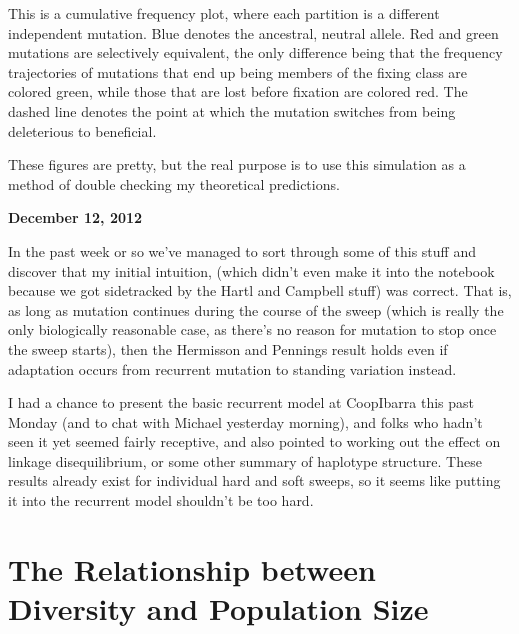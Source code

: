 \documentclass[reqno]{amsart}
\begin{document}
This is a cumulative frequency plot, where each partition is a different independent mutation. Blue denotes the ancestral, neutral allele. Red and green mutations are selectively equivalent, the only difference being that the frequency trajectories of mutations that end up being members of the fixing class are colored green, while those that are lost before fixation are colored red. The dashed line denotes the point at which the mutation switches from being deleterious to beneficial.

These figures are pretty, but the real purpose is to use this simulation as a method of double checking my theoretical predictions.
\begin{flushright}
	\textbf{December 12, 2012}
\end{flushright}
In the past week or so we've managed to sort through some of this stuff and discover that my initial intuition, (which didn't even make it into the notebook because we got sidetracked by the Hartl and Campbell stuff) was correct. That is, as long as mutation continues during the course of the sweep (which is really the only biologically reasonable case, as there's no reason for mutation to stop once the sweep starts), then the Hermisson and Pennings result holds even if adaptation occurs from recurrent mutation to standing variation instead.

I had a chance to present the basic recurrent model at CoopIbarra this past Monday (and to chat with Michael yesterday morning), and folks who hadn't seen it yet seemed fairly receptive, and also pointed to working out the effect on linkage disequilibrium, or some other summary of haplotype structure. These results already exist for individual hard\cite{Stephan2006, McVean2007, Pfaffelhuber2008} and soft\cite{Pokalyuk2012} sweeps, so it seems like putting it into the recurrent model shouldn't be too hard.

\section*{The Relationship between Diversity and Population Size} 
\end{document}
